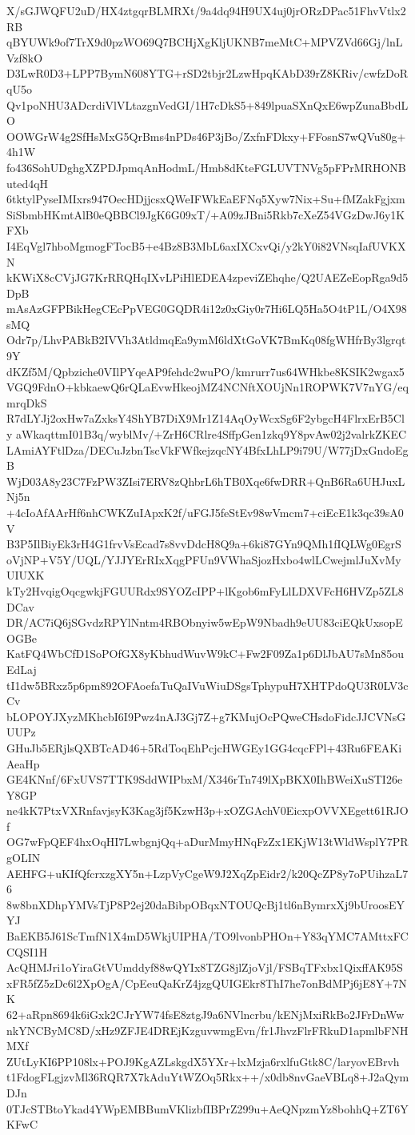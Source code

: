 X/sGJWQFU2uD/HX4ztgqrBLMRXt/9a4dq94H9UX4uj0jrORzDPac51FhvVtlx2RB
qBYUWk9of7TrX9d0pzWO69Q7BCHjXgKljUKNB7meMtC+MPVZVd66Gj/lnLVzf8kO
D3LwR0D3+LPP7BymN608YTG+rSD2tbjr2LzwHpqKAbD39rZ8KRiv/cwfzDoRqU5o
Qv1poNHU3ADcrdiVlVLtazgnVedGI/1H7cDkS5+849lpuaSXnQxE6wpZunaBbdLO
OOWGrW4g2SfHsMxG5QrBms4nPDs46P3jBo/ZxfnFDkxy+FFosnS7wQVu80g+4h1W
fo436SohUDghgXZPDJpmqAnHodmL/Hmb8dKteFGLUVTNVg5pFPrMRHONButed4qH
6tktylPyseIMIxrs947OecHDjjcsxQWeIFWkEaEFNq5Xyw7Nix+Su+fMZakFgjxm
SiSbmbHKmtAlB0eQBBCl9JgK6G09xT/+A09zJBni5Rkb7cXeZ54VGzDwJ6y1KFXb
I4EqVgl7hboMgmogFTocB5+e4Bz8B3MbL6axIXCxvQi/y2kY0i82VNsqIafUVKXN
kKWiX8cCVjJG7KrRRQHqIXvLPiHlEDEA4zpeviZEhqhe/Q2UAEZeEopRga9d5DpB
mAsAzGFPBikHegCEcPpVEG0GQDR4i12z0xGiy0r7Hi6LQ5Ha5O4tP1L/O4X98sMQ
Odr7p/LhvPABkB2IVVh3AtldmqEa9ymM6ldXtGoVK7BmKq08fgWHfrBy3lgrqt9Y
dKZf5M/Qpbziche0VIlPYqeAP9fehdc2wuPO/kmrurr7us64WHkbe8KSIK2wgax5
VGQ9FdnO+kbkaewQ6rQLaEvwHkeojMZ4NCNftXOUjNn1ROPWK7V7nYG/eqmrqDkS
R7dLYJj2oxHw7aZxksY4ShYB7DiX9Mr1Z14AqOyWcxSg6F2ybgcH4FlrxErB5Cly
aWkaqttmI01B3q/wyblMv/+ZrH6CRlre4SffpGen1zkq9Y8pvAw02j2valrkZKEC
LAmiAYFtlDza/DECuJzbnTscVkFWfkejzqcNY4BfxLhLP9i79U/W77jDxGndoEgB
WjD03A8y23C7FzPW3ZIsi7ERV8zQhbrL6hTB0Xqe6fwDRR+QnB6Ra6UHJuxLNj5n
+4cIoAfAArHf6nhCWKZuIApxK2f/uFGJ5feStEv98wVmcm7+ciEcE1k3qc39sA0V
B3P5IlBiyEk3rH4G1frvVsEcad7s8vvDdcH8Q9a+6ki87GYn9QMh1fIQLWg0EgrS
oVjNP+V5Y/UQL/YJJYErRIxXqgPFUn9VWhaSjozHxbo4wlLCwejmlJuXvMyUIUXK
kTy2HvqigOqcgwkjFGUURdx9SYOZcIPP+lKgob6mFyLlLDXVFcH6HVZp5ZL8DCav
DR/AC7iQ6jSGvdzRPYlNntm4RBObnyiw5wEpW9Nbadh9eUU83ciEQkUxsopEOGBe
KatFQ4WbCfD1SoPOfGX8yKbhudWuvW9kC+Fw2F09Za1p6DlJbAU7sMn85ouEdLaj
tI1dw5BRxz5p6pm892OFAoefaTuQaIVuWiuDSgsTphypuH7XHTPdoQU3R0LV3cCv
bLOPOYJXyzMKhcbI6I9Pwz4nAJ3Gj7Z+g7KMujOcPQweCHsdoFidcJJCVNsGUUPz
GHuJb5ERjlsQXBTcAD46+5RdToqEhPcjcHWGEy1GG4cqcFPl+43Ru6FEAKiAeaHp
GE4KNnf/6FxUVS7TTK9SddWIPbxM/X346rTn749lXpBKX0IhBWeiXuSTI26eY8GP
ne4kK7PtxVXRnfavjsyK3Kag3jf5KzwH3p+xOZGAchV0EicxpOVVXEgett61RJOf
OG7wFpQEF4hxOqHI7LwbgnjQq+aDurMmyHNqFzZx1EKjW13tWldWsplY7PRgOLIN
AEHFG+uKIfQfcrxzgXY5n+LzpVyCgeW9J2XqZpEidr2/k20QcZP8y7oPUihzaL76
8w8bnXDhpYMVsTjP8P2ej20daBibpOBqxNTOUQcBj1tl6nBymrxXj9bUroosEYYJ
BaEKB5J61ScTmfN1X4mD5WkjUIPHA/TO9lvonbPHOn+Y83qYMC7AMttxFCCQSI1H
AcQHMJri1oYiraGtVUmddyf88wQYIx8TZG8jlZjoVjl/FSBqTFxbx1QixffAK95S
xFR5fZ5zDc6l2XpOgA/CpEeuQaKrZ4jzgQUIGEkr8ThI7he7onBdMPj6jE8Y+7NK
62+aRpn8694k6iGxk2CJrYW74fsE8ztgJ9a6NVlncrbu/kENjMxiRkBo2JFrDnWw
nkYNCByMC8D/xHz9ZFJE4DREjKzguvwmgEvn/fr1JhvzFlrFRkuD1apmlbFNHMXf
ZUtLyKI6PP108lx+POJ9KgAZLskgdX5YXr+lxMzja6rxlfuGtk8C/laryovEBrvh
t1FdogFLgjzvMl36RQR7X7kAduYtWZOq5Rkx++/x0db8nvGaeVBLq8+J2aQymDJn
0TJcSTBtoYkad4YWpEMBBumVKlizbfIBPrZ299u+AeQNpzmYz8bohhQ+ZT6YKFwC
